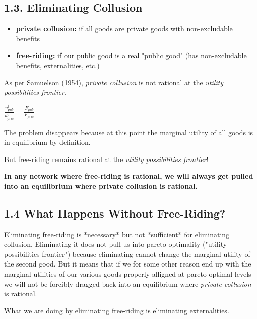 \documentclass[oneside]{article}   	%
\begin{document}
\subsection*{1.3. Eliminating Collusion}
\vspace{0.5em}

\begin{itemize}
  \item \textbf{private collusion:} if all goods are private goods with non-excludable benefits
  \item \textbf{free-riding:} if our public good is a real "public good" (has non-excludable benefits, externalities, etc.)
\end{itemize}

As per Samuelson (1954), \textit{private collusion} is not rational at the \textit{utility possibilities frontier}.

\LARGE
\begin{adjustwidth}{1.5em}{1.5em}
\begin{math}
\frac{u_{pub}^i}{u_{priv}^i} = \frac{F_{pub}}{F_{priv}}
\end{math}
\end{adjustwidth}
\normalsize

The problem disappears because at this point the marginal utility of all goods is in equilibrium by definition.

But free-riding remains rational at the \textit{utility possibilities frontier}!

\textbf{In any network where free-riding is rational, we will always get pulled into an equilibrium where private collusion is rational.}


\subsection*{1.4 What Happens Without Free-Riding?}

Eliminating free-riding is *necessary* but not *sufficient* for eliminating collusion. Eliminating it does not pull us into pareto optimality ("utility possibilities frontier") because eliminating cannot change the marginal utility of the second good. But it means that if we for some other reason end up with the marginal utilities of our various goods properly alligned at pareto optimal levels we will not be forcibly dragged back into an equilibrium where \textit{private collusion} is rational.

What we are doing by eliminating free-riding is eliminating externalities.
\end{document}
